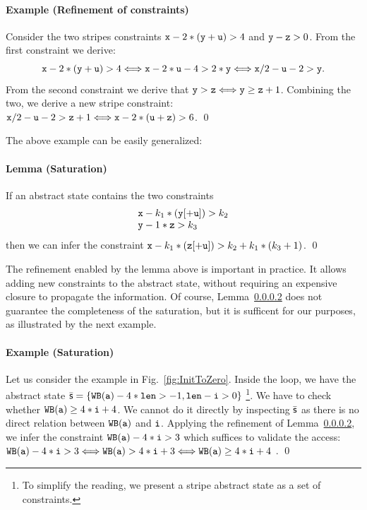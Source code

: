 \documentclass[10pt]{sigplanconf}
\begin{document}
\paragraph{Example (Refinement of constraints)}
Consider the two stripes constraints $\mathtt{x}-2*(\mathtt{y}+\mathtt{u})>4$
and $\mathtt{y}-\mathtt{z}>0 $.
From the first constraint we derive: 
\[
\mathtt{x}-2*(\mathtt{y}+\mathtt{u})>4 \Longleftrightarrow \mathtt{x}-2*\mathtt{u}-4>2*\mathtt{y} \Longleftrightarrow \mathtt{x}/2-\mathtt{u}-2>\mathtt{y}.
\]
From the second constraint we derive that $\mathtt{y}>\mathtt{z} \Longleftrightarrow \mathtt{y} \geq \mathtt{z}+1$. 
Combining the two, we derive a new  stripe constraint: $\mathtt{x}/2-\mathtt{u}-2>\mathtt{z}+1 \Longleftrightarrow \mathtt{x}-2*(\mathtt{u}+\mathtt{z})>6$. \qed

The  above example can be easily generalized:
\paragraph{Lemma (Saturation)}
\label{lemma:chiusura}
  If an abstract state contains the two constraints
  \[
  \begin{array}{l}
    \mathtt{x}-k_1*(\mathtt{y}[+\mathtt{u}])>k_2\\
    \mathtt{y}-1*\mathtt{z}>k_3\\
  \end{array}
  \]
  then we can infer the constraint $\mathtt{x}-k_1*(\mathtt{z}[+\mathtt{u}])>k_2+k_1*(k_3+1)$.
\qed


The refinement enabled by the lemma above is important in practice.
It allows adding new constraints to the abstract state, without requiring an expensive closure to propagate the information.
Of course, Lemma~\ref{lemma:chiusura} does not guarantee the completeness of the saturation, but it is sufficent for our purposes, as illustrated by the next example.

\paragraph{Example (Saturation)}
Let us consider the example in Fig.~\ref{fig:InitToZero}.
Inside the loop, we have the abstract state $\bar{\mathsf{s}} = \{ \mathtt{WB}(\mathtt{\mathtt{a}})-4*\mathtt{len} > -1, \mathtt{len}-\mathtt{i} > 0 \}$ \footnote{To simplify the reading, we present a stripe abstract state as a set of constraints.}. 
We have to check whether $\mathtt{WB}(\mathtt{\mathtt{a}})\geq 4*\mathtt{i}+4$.
We cannot do it directly by inspecting $\bar{\mathsf{s}}$ as there is no direct relation between $\mathtt{WB}(\mathtt{\mathtt{a}})$ and $\mathtt{i}$. 
Applying the refinement of Lemma~\ref{lemma:chiusura}, we infer the constraint $\mathtt{WB}(\mathtt{\mathtt{a}})-4*\mathtt{i}>3$ which suffices to  validate the access:  $\mathtt{WB}(\mathtt{\mathtt{a}})-4*\mathtt{i}>3  \Longleftrightarrow \mathtt{WB}(\mathtt{\mathtt{a}})>4*\mathtt{i}+3 \Longleftrightarrow \mathtt{WB}(\mathtt{\mathtt{a}})\geq 4*\mathtt{i}+4$ . \qed
\end{document}
